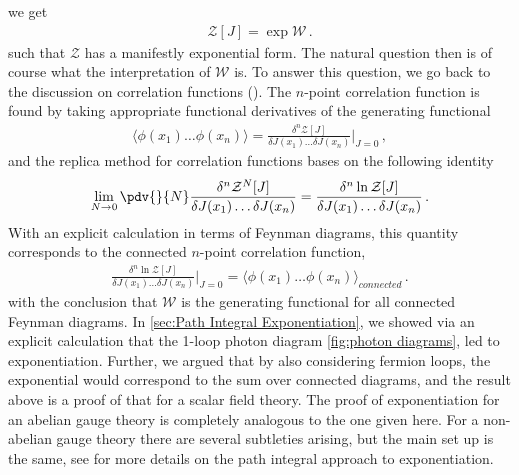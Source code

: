 we get
\begin{align}
    \mathcal{Z}[J]=\exp{\mathcal{W}}\,.
\end{align}
such that $\mathcal{Z}$ has a manifestly exponential form. The natural question then is of course what the interpretation of $\mathcal{W}$ is. To answer this question, we go back to the discussion on correlation functions (). The $n$-point correlation function is found by taking appropriate functional derivatives of the generating functional
\begin{align}
    \langle \phi(x_1)\dots \phi(x_n)\rangle=\frac{\delta^{n}\mathcal{Z}[J]}{\delta J(x_1)\dots\delta J(x_n)}\Big|_{J=0}\,,
\end{align}
and the replica method for correlation functions bases on the following identity
\begin{align}
    \lim_{N\to 0}\pdv{}{N}\frac{\delta^{n}\mathcal{Z}^{N}[J]}{\delta J(x_1)\dots\delta J(x_n)}=\frac{\delta^{n}\ln\mathcal{Z}[J]}{\delta J(x_1)\dots\delta J(x_n)}\,.
\end{align}
With an explicit calculation in terms of Feynman diagrams, this quantity corresponds to the connected $n$-point correlation function,
\begin{align}
    \frac{\delta^{n}\ln\mathcal{Z}[J]}{\delta J(x_1)\dots\delta J(x_n)}\Big|_{J=0}=\langle \phi(x_1)\dots \phi(x_n)\rangle_{connected}\,.
\end{align}
with the conclusion  that $\mathcal{W}$ is the generating functional for all connected Feynman diagrams. In \cref{sec:Path Integral Exponentiation}, we showed via an explicit calculation that the 1-loop photon diagram \cref{fig:photon diagrams}, led to exponentiation. Further, we argued that by also considering fermion loops, the exponential would correspond to the sum over connected diagrams, and the result above is a proof of that for a scalar field theory. The proof of exponentiation for an abelian gauge theory is completely analogous to the one given here. For a non-abelian gauge theory there are several subtleties arising, but the main set up is the same, see \cite{White:2015wha} for more details on the path integral approach to exponentiation.

